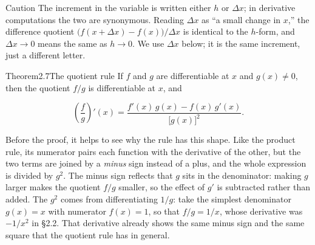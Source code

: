 \documentclass[a4paper,12pt,oneside]{memoir}
\begin{document}
\begin{envcaution}{Caution}{}{}
The increment in the variable is written either \(h\) or \(\Delta x\); in derivative computations the two are synonymous. Reading \(\Delta x\) as “a small change in \(x\),” the difference quotient \(\bigl(f(x + \Delta x) - f(x)\bigr)/\Delta x\) is identical to the \(h\)-form, and \(\Delta x \to 0\) means the same as \(h \to 0\). We use \(\Delta x\) below; it is the same increment, just a different letter.
\end{envcaution}
\begin{envtheorem}{Theorem}{2.7}{The quotient rule}
If \(f\) and \(g\) are differentiable at \(x\) and \(g(x) \ne 0\), then the quotient \(f/g\) is differentiable at \(x\), and

\[ \left(\frac{f}{g}\right)'(x) = \frac{f'(x)\,g(x) - f(x)\,g'(x)}{\bigl[g(x)\bigr]^{2}}. \]
\end{envtheorem}
Before the proof, it helps to see why the rule has this shape. Like the product rule, its numerator pairs each function with the derivative of the other, but the two terms are joined by a \emph{minus} sign instead of a plus, and the whole expression is divided by \(g^{2}\). The minus sign reflects that \(g\) sits in the denominator: making \(g\) larger makes the quotient \(f/g\) smaller, so the effect of \(g'\) is subtracted rather than added. The \(g^{2}\) comes from differentiating \(1/g\): take the simplest denominator \(g(x) = x\) with numerator \(f(x) = 1\), so that \(f/g = 1/x\), whose derivative was \(-1/x^{2}\) in §2.2. That derivative already shows the same minus sign and the same square that the quotient rule has in general.
\end{document}
